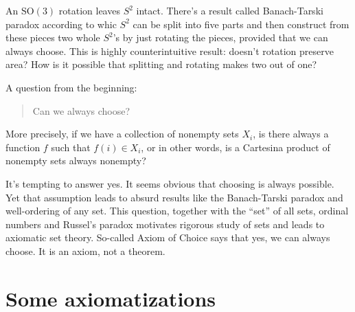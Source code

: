 \documentclass[11pt,oneside,%
]{memoir}
\begin{document}
An \(\mathrm{SO}(3)\) rotation leaves \(S^2\) intact. There's a result called Banach-Tarski paradox according to whic \(S^2\) can be split into five parts and then construct from these pieces two whole \(S^2\)'s by just rotating the pieces, provided that we can always choose. This is highly counterintuitive result: doesn't rotation preserve area? How is it possible that splitting and rotating makes two out of one?

A question from the beginning:
\begin{quote}
    Can we always choose?
\end{quote}
More precisely, if we have a collection of nonempty sets \(X_i\), is there always a function \(f\) such that \(f(i)\in X_i\), or in other words, is a Cartesina product of nonempty sets always nonempty?%

It's tempting to answer yes. It seems obvious that choosing is always possible. Yet that assumption leads to absurd results like the Banach-Tarski paradox and well-ordering of any set. This question, together with the ``set'' of all sets, ordinal numbers and Russel's paradox motivates rigorous study of sets and leads to axiomatic set theory. So-called Axiom of Choice says that yes, we can always choose. It is an axiom, not a theorem.





\section{Some axiomatizations}

\end{document}
